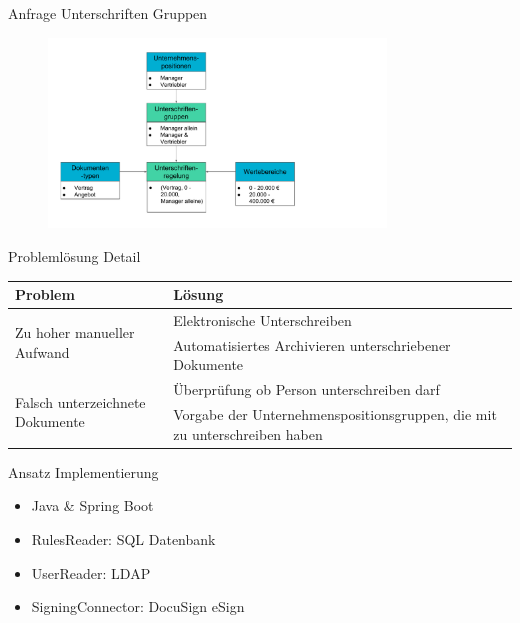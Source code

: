 \documentclass[utf8, xcolor, usenames,dvipsnames, aspectratio=169, notes, ]{beamer}
\begin{document}
\begin{frame}{Anfrage Unterschriften Gruppen}
	\begin{figure}
		\centering
		\includegraphics[width=0.8\textwidth, height=0.78\textheight]{./images/ruleSet}
	\end{figure}
\end{frame}

\begin{frame}{Problemlösung Detail}
	\begin{table}
		\begin{tabular}{|p{6cm}|p{6cm}|}\hline
			\rowcolor{codeBlue}\textbf{Problem} & \textbf{Lösung} \\ \hline
			\multirow{2}{*}{Zu hoher manueller Aufwand} & Elektronische Unterschreiben \\ \cline{2-2}
								& Automatisiertes Archivieren unterschriebener Dokumente \\ \hline
			\multirow{2}{*}{Falsch unterzeichnete Dokumente}  & Überprüfung ob Person unterschreiben darf \\ \cline{2-2}
								& Vorgabe der Unternehmenspositionsgruppen, die mit zu unterschreiben haben \\ \hline
		\end{tabular}
	\end{table}
\end{frame}

\begin{frame}{Ansatz Implementierung}
	\begin{itemize}
		\item Java \& Spring Boot
		\item RulesReader: SQL Datenbank
		\item UserReader: LDAP
		\item SigningConnector: DocuSign eSign
	\end{itemize}
	
\end{frame}
\end{document}
